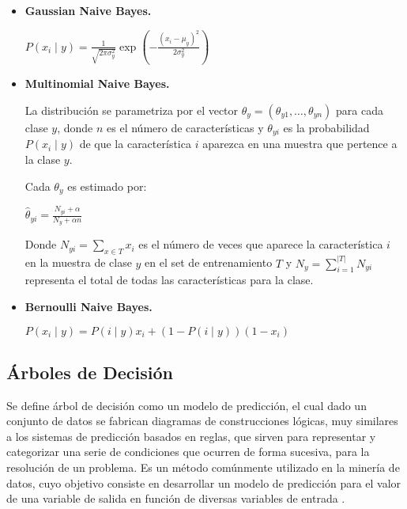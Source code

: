 \begin{itemize}
	
	\item \textbf{Gaussian Naive Bayes.}
	
	\begin{center}
		$P(x_i \mid y) = \frac{1}{\sqrt{2\pi\sigma^2_y}} \exp\left(-\frac{(x_i - \mu_y)^2}{2\sigma^2_y}\right)$
	\end{center}
	
	\item \textbf{Multinomial Naive Bayes.}
	
	La distribución se parametriza por el vector $\theta_y = (\theta_{y1},\ldots,\theta_{yn})$ para cada clase $y$, donde $n$ es el número de características y $\theta_{yi}$ es la probabilidad $P(x_i \mid y)$ de que la característica $i$ aparezca en una muestra que pertence a la clase $y$.
	
	Cada $\theta_y$ es estimado por:
	
	\begin{center}
		
		$\hat{\theta}_{yi} = \frac{ N_{yi} + \alpha}{N_y + \alpha n}$		
	\end{center}
	
	Donde $N_{yi} = \sum_{x \in T} x_i$ es el número  de veces que aparece la característica $i$ en la muestra de clase $y$ en el set de entrenamiento $T$ y $N_{y} = \sum_{i=1}^{|T|} N_{yi}$ representa el total de todas las características para la clase.
	
	\item \textbf{Bernoulli Naive Bayes.}
	
	\begin{center}
		$P(x_i \mid y) = P(i \mid y) x_i + (1 - P(i \mid y)) (1 - x_i)$
	\end{center}
	
\end{itemize}

\subsection{Árboles de Decisión}

Se define árbol de  decisión como un modelo de predicción, el cual  dado un conjunto de datos se fabrican diagramas de construcciones lógicas, muy similares a los sistemas de predicción basados en reglas, que sirven para representar y categorizar una serie de condiciones que ocurren de forma sucesiva, para la resolución de un problema.  Es un método comúnmente utilizado en la minería de datos, cuyo objetivo consiste en desarrollar un modelo de predicción para el valor de una variable de salida en función de diversas variables de entrada \cite{freund1999alternating}.

